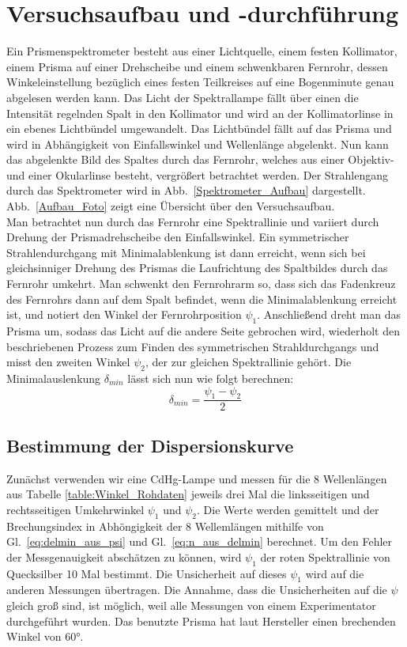 \documentclass[12pt,a4paper]{article}
\begin{document}
\section{Versuchsaufbau und -durchführung}
Ein Prismenspektrometer besteht aus einer Lichtquelle, einem festen Kollimator, einem Prisma auf einer Drehscheibe und einem schwenkbaren Fernrohr, dessen Winkeleinstellung bezüglich eines festen Teilkreises auf eine Bogenminute genau abgelesen werden kann. Das Licht der Spektrallampe fällt über einen die Intensität regelnden Spalt in den Kollimator und wird an der Kollimatorlinse in ein ebenes Lichtbündel umgewandelt. Das Lichtbündel fällt auf das Prisma und wird in Abhängigkeit von Einfallswinkel und Wellenlänge abgelenkt. Nun kann das abgelenkte Bild des Spaltes durch das Fernrohr, welches aus einer Objektiv- und einer Okularlinse besteht, vergrößert betrachtet werden. Der Strahlengang durch das Spektrometer wird in Abb.~\ref{Spektrometer_Aufbau} dargestellt. Abb.~\ref{Aufbau_Foto} zeigt eine Übersicht über den Versuchsaufbau.\\
Man betrachtet nun durch das Fernrohr eine Spektrallinie und variiert durch Drehung der Prismadrehscheibe den Einfallswinkel. Ein symmetrischer Strahlendurchgang mit Minimalablenkung ist dann erreicht, wenn sich bei gleichsinniger Drehung des Prismas die Laufrichtung des Spaltbildes durch das Fernrohr umkehrt. Man schwenkt den Fernrohrarm so, dass sich das Fadenkreuz des Fernrohrs dann auf dem Spalt befindet, wenn die Minimalablenkung erreicht ist, und notiert den Winkel der Fernrohrposition $\psi_1$. Anschließend dreht man das Prisma um, sodass das Licht auf die andere Seite gebrochen wird, wiederholt den beschriebenen Prozess zum Finden des symmetrischen Strahldurchgangs und misst den zweiten Winkel $\psi_2$, der zur gleichen Spektrallinie gehört. Die Minimalauslenkung $\delta_{min}$ lässt sich nun wie folgt berechnen:
\begin{equation}\label{eq:delmin_aus_psi}
\delta_{min}=\frac{\psi_1-\psi_2}{2}
\end{equation}
\subsection{Bestimmung der Dispersionskurve}
Zunächst verwenden wir eine CdHg-Lampe und messen für die 8 Wellenlängen aus Tabelle \ref{table:Winkel_Rohdaten} jeweils drei Mal die linksseitigen und rechtsseitigen Umkehrwinkel $\psi_1$ und $\psi_2$. Die Werte werden gemittelt und der Brechungsindex in Abhöngigkeit der 8 Wellemlängen mithilfe von Gl.~\eqref{eq:delmin_aus_psi} und Gl.~\eqref{eq:n_aus_delmin} berechnet. Um den Fehler der Messgenauigkeit abschätzen zu können, wird $\psi_1$ der roten Spektrallinie von Quecksilber 10 Mal bestimmt. Die Unsicherheit auf dieses $\psi_1$ wird auf die anderen Messungen übertragen. Die Annahme, dass die Unsicherheiten auf die $\psi$ gleich groß sind, ist möglich, weil alle Messungen von einem Experimentator durchgeführt wurden. Das benutzte Prisma hat laut Hersteller einen brechenden Winkel von $\ang{60}$. \\\\
\end{document}
